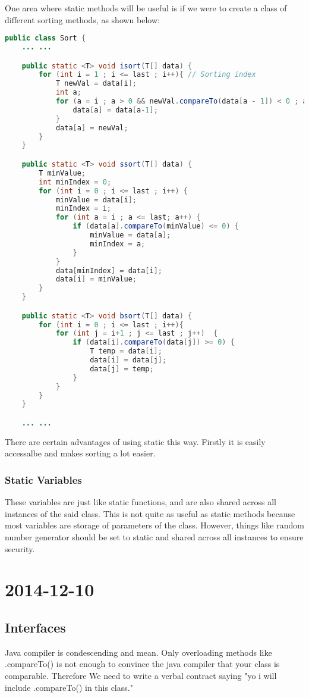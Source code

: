 \documentclass [12 pt, twoside] {article}
\begin{document}
One area where static methods will be useful is if we were to create a class of different sorting
methods, as shown below:
\begin{lstlisting}[language=java]
public class Sort {
	... ...

	public static <T> void isort(T[] data) {
		for (int i = 1 ; i <= last ; i++){ // Sorting index
			T newVal = data[i];
			int a;
			for (a = i ; a > 0 && newVal.compareTo(data[a - 1]) < 0 ; a--) {
				data[a] = data[a-1];
			}
			data[a] = newVal;
		}
	}

	public static <T> void ssort(T[] data) {
		T minValue;
		int minIndex = 0;
		for (int i = 0 ; i <= last ; i++) {
			minValue = data[i];
			minIndex = i;
			for (int a = i ; a <= last; a++) {
				if (data[a].compareTo(minValue) <= 0) {
					minValue = data[a];
					minIndex = a;
				}
			}
			data[minIndex] = data[i];
			data[i] = minValue;
		}
	}

	public static <T> void bsort(T[] data) {
		for (int i = 0 ; i <= last ; i++){
			for (int j = i+1 ; j <= last ; j++)  {
				if (data[i].compareTo(data[j]) >= 0) {
					T temp = data[i];
					data[i] = data[j];
					data[j] = temp;
				}
			}
		}
	}

	... ...
\end{lstlisting}


There are certain advantages of using static this way. Firstly it is easily accessalbe
and makes sorting a lot easier.

\subsubsection{Static Variables}


These variables are just like static functions, and are also shared across all instances
of the said class. This is not quite as useful as static methods because most variables
are storage of parameters of the class. However, things like random number generator should
be set to static and shared across all instances to ensure security.

\section{2014-12-10}

\subsection{Interfaces}

Java compiler is condescending and mean. Only overloading methods like .compareTo()
is not enough to convince the java compiler that your class is comparable. Therefore
We need to write a verbal contract saying "yo i will include .compareTo() in this class."
\end{document}
